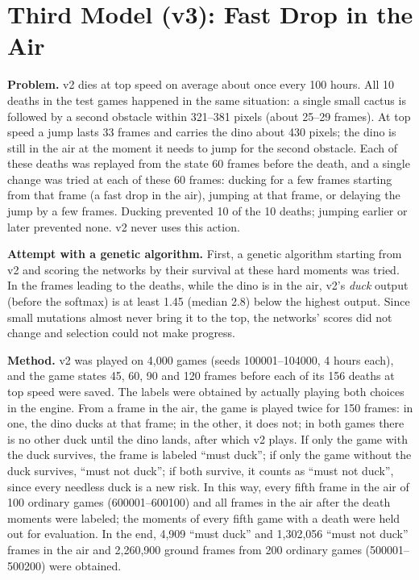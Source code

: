 \documentclass[11pt,a4paper]{article}
\begin{document}
\section{Third Model (v3): Fast Drop in the Air}
\label{sec:v3}

\textbf{Problem.} v2 dies at top speed on average about once every 100 hours. All 10 deaths in the test games happened in the same situation: a single small cactus is followed by a second obstacle within 321--381 pixels (about 25--29 frames). At top speed a jump lasts 33 frames and carries the dino about 430 pixels; the dino is still in the air at the moment it needs to jump for the second obstacle. Each of these deaths was replayed from the state 60 frames before the death, and a single change was tried at each of these 60 frames: ducking for a few frames starting from that frame (a fast drop in the air), jumping at that frame, or delaying the jump by a few frames. Ducking prevented 10 of the 10 deaths; jumping earlier or later prevented none. v2 never uses this action.

\textbf{Attempt with a genetic algorithm.} First, a genetic algorithm starting from v2 and scoring the networks by their survival at these hard moments was tried. In the frames leading to the deaths, while the dino is in the air, v2's \emph{duck} output (before the softmax) is at least 1.45 (median 2.8) below the highest output. Since small mutations almost never bring it to the top, the networks' scores did not change and selection could not make progress.

\textbf{Method.} v2 was played on 4,000 games (seeds 100001--104000, 4 hours each), and the game states 45, 60, 90 and 120 frames before each of its 156 deaths at top speed were saved. The labels were obtained by actually playing both choices in the engine. From a frame in the air, the game is played twice for 150 frames: in one, the dino ducks at that frame; in the other, it does not; in both games there is no other duck until the dino lands, after which v2 plays. If only the game with the duck survives, the frame is labeled ``must duck''; if only the game without the duck survives, ``must not duck''; if both survive, it counts as ``must not duck'', since every needless duck is a new risk. In this way, every fifth frame in the air of 100 ordinary games (600001--600100) and all frames in the air after the death moments were labeled; the moments of every fifth game with a death were held out for evaluation. In the end, 4,909 ``must duck'' and 1,302,056 ``must not duck'' frames in the air and 2,260,900 ground frames from 200 ordinary games (500001--500200) were obtained.
\end{document}
